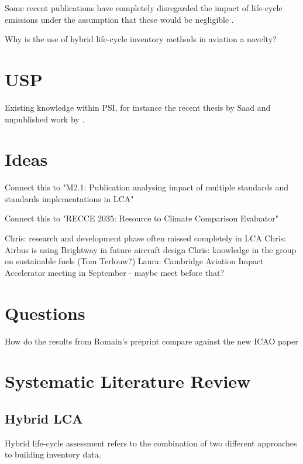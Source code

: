 \documentclass{article}
\begin{document}
	Some recent publications have completely disregarded the impact of life-cycle emissions under the assumption that these would be negligible \cite{brazzola_definitions_2022}.
	
	Why is the use of hybrid life-cycle inventory methods in aviation a novelty?
	
\section{USP}
	
    Existing knowledge within PSI, for instance the recent thesis by Saad \cite{saad_synthetic_2022} and unpublished work by \cite{sacchi_climate-neutral_2022}.

\section{Ideas}

    Connect this to "M2.1: Publication analysing impact of multiple standards and standards implementations in LCA"

    Connect this to "RECCE 2035: Resource to Climate Comparison Evaluator"

	Chris: research and development phase often missed completely in LCA
	Chris: Airbus is using Brightway in future aircraft design
	Chris: knowledge in the group on sustainable fuels (Tom Terlouw?)
	Laura: Cambridge Aviation Impact Accelerator meeting in September - maybe meet before that?

\section{Questions}

How do the results from Romain's preprint \cite{sacchi_climate-neutral_2022} compare against the new ICAO paper \cite{prussi_corsia_2021}

\newpage
\section{Systematic Literature Review}


    \subsection{Hybrid LCA}
        
        Hybrid life-cycle assessment refers to the combination of two different approaches to building inventory data. 
        
\end{document}
